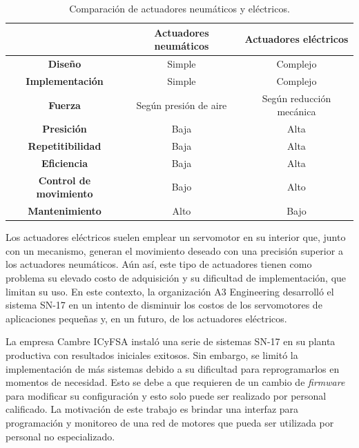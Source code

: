 \begin{table}[htpb]
	\centering
	\caption[Comparación de actuadores neumáticos y eléctricos]{Comparación de actuadores neumáticos y eléctricos.}
	\begin{tabular}{c  c  c}    
		\toprule
		 	 & \textbf{Actuadores neumáticos}  & \textbf{Actuadores eléctricos}\\
		\midrule
		\textbf{Diseño} 			& Simple 		& Complejo  \\
		\textbf{Implementación} 	& Simple 		& Complejo \\			
		\textbf{Fuerza} 			& Según presión de aire	& Según reducción mecánica \\
		\textbf{Presición}			& Baja 	& Alta \\
		\textbf{Repetitibilidad}	& Baja 	& Alta \\
		\textbf{Eficiencia}			& Baja 	& Alta \\
		\textbf{Control de movimiento}	& Bajo 	& Alto \\
		\textbf{Mantenimiento}	& Alto 	& Bajo \\
		\bottomrule
		\hline
	\end{tabular}
	\label{tab:comparacion_neumatico_electrico}
\end{table}

Los actuadores eléctricos suelen emplear un servomotor en su interior que, junto con un mecanismo, generan el movimiento deseado con una precisión superior a los actuadores neumáticos. Aún así, este tipo de actuadores tienen como problema su elevado costo de adquisición y su dificultad de implementación, que limitan su uso. En este contexto, la organización A3 Engineering desarrolló el sistema SN-17 en un intento de disminuir los costos de los servomotores de aplicaciones pequeñas y, en un futuro, de los actuadores eléctricos.

La empresa Cambre ICyFSA instaló una serie de sistemas SN-17 en su planta productiva con resultados iniciales exitosos. Sin embargo, se limitó la implementación de más sistemas debido a su dificultad para reprogramarlos en momentos de necesidad. Esto se debe a que requieren de un cambio de \textit{firmware} para modificar su configuración y esto solo puede ser realizado por personal calificado. La motivación de este trabajo es brindar una interfaz para programación y monitoreo de una red de motores que pueda ser utilizada por personal no especializado.



